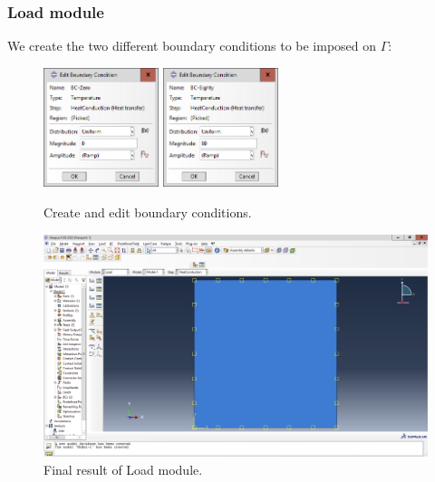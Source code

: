 \newpage

\subsubsection{Load module}

We create the two different boundary conditions to be imposed on $\Gamma$:
\begin{figure}[H]
    \centering
    \includegraphics[width=0.3\textwidth]{Images/ab2/ab10.png} \qquad
    \includegraphics[width=0.3\textwidth]{Images/ab2/ab11.png}
    \caption{Create and edit boundary conditions.}
    \label{fig:ab1011}
\end{figure}

\begin{figure}[H]
    \centering
    \includegraphics[width=\textwidth]{Images/ab2/ab12.png}
    \caption{Final result of Load module.}
    \label{fig:ab12}
\end{figure}

